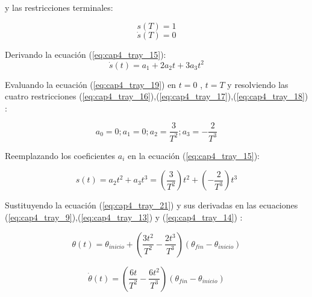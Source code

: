              y las restricciones terminales:
             
            \begin{equation}
                s(T) = 1 
                \label{eq:cap4_tray_17}
             \end{equation} 
            \begin{equation}
                \dot{s}(T) = 0 
                \label{eq:cap4_tray_18}
             \end{equation}         
             
            Derivando la ecuación (\ref{eq:cap4_tray_15}):
            \begin{equation}
                \dot{s}(t)= a_{1}+2a_{2}t+3a_{3}t^{2}
                \label{eq:cap4_tray_19}
             \end{equation}     
            
        Evaluando la ecuación (\ref{eq:cap4_tray_19}) en  $t = 0$ , $t = T$ y resolviendo las cuatro restricciones (\ref{eq:cap4_tray_16}),(\ref{eq:cap4_tray_17}),(\ref{eq:cap4_tray_18}) :
        
            \begin{equation}
                 a_{0}=0;a_{1}=0;a_{2}=\frac{3}{T^2};a_{3}=-\frac{2}{T^3}
                \label{eq:cap4_tray_20}
             \end{equation}     
        
        Reemplazando los coeficientes $a_i$ en la ecuación (\ref{eq:cap4_tray_15}): 
        
            \begin{equation}
                s(t)=a_{2}t^{2}+a_{3}t^{3} = (\frac{3}{T^2})t^{2}+(-\frac{2}{T^3})t^{3}
                \label{eq:cap4_tray_21}
             \end{equation}  
             

            Sustituyendo la ecuación (\ref{eq:cap4_tray_21}) y sus derivadas en las ecuaciones (\ref{eq:cap4_tray_9}),(\ref{eq:cap4_tray_13}) y  (\ref{eq:cap4_tray_14}) :
            
            \begin{equation}
                \theta(t)= \theta_{inicio} + \left(  \frac{3t^{2}}{T^2}-\frac{2t^{3}}{T^3} \right) (\theta_{fin}-\theta_{inicio})            
                \label{eq:cap4_tray_22}
             \end{equation}   
             
            \begin{equation}
                  \dot{\theta}(t)= \left(  \frac{6t}{T^2}-\frac{6t^{2}}{T^3} \right) (\theta_{fin}-\theta_{inicio})
                \label{eq:cap4_tray_23}
             \end{equation} 
             
